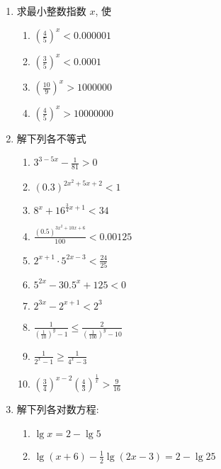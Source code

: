 \begin{enumerate}
\item  求最小整数指数 $x$, 使
\begin{multicols}{2}
  \begin{enumerate}
    \item  $\left(\frac{4}{5}\right)^{x}<0.000001$
  \item  $\left(\frac{3}{5}\right)^{x}<0.0001$
    \item $\left(\frac{10}{9}\right)^{x}>1000000$
    \item $\left(\frac{4}{5}\right)^{x}>10000000$
  \end{enumerate}
\end{multicols}

\item  解下列各不等式
\begin{multicols}{2}
\begin{enumerate}
 \item  $3^{3-5 x}-\frac{1}{81}>0$
\item  $(0.3)^{2 x^{2}+5 x+2}<1$
\item  $8^{x}+16^{\tfrac{3}{4} x+1}<34$
\item  $\frac{(0.5)^{3 x^{2}+10 x+6}}{100}<0.00125$
\item  $2^{x+1} \cdot 5^{2 x-3}<\frac{24}{25}$
\item  $5^{2x}-30.5^{x}+125<0$
\item  $2^{3 x}-2^{x+1}<2^{3} $
\item  $\frac{1}{\left(\frac{1}{10}\right)^{y}-1} \leqslant \frac{2}{\left(\frac{1}{100}\right)^{y}-10}$
\item  $\frac{1}{2^{x}-1} \geqslant \frac{1}{4^{x}-3}$
\item  $\left(\frac{3}{4}\right)^{x-2}\left(\frac{4}{3}\right)^{\tfrac{1}{x}}>\frac{9}{16}$
\end{enumerate}
\end{multicols}


\item  解下列各对数方程:

  \begin{enumerate}
   \item  $\lg x=2-\lg 5$
   \item $\lg(x+6)-\frac{1}{2}\lg(2x-3)=2-\lg 25$
  \end{enumerate}



\end{enumerate}
